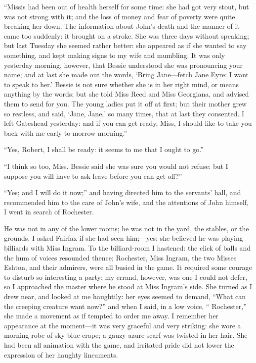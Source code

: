 \enquote{Missis had been out of health herself for some time: she had
	got very stout, but was not strong with it; and the loss of money and
	fear of poverty were quite breaking her down. The information about \Mr{}
	John's death and the manner of it came too suddenly: it brought on a
	stroke. She was three days without speaking; but last Tuesday she
	seemed rather better: she appeared as if she wanted to say something,
	and kept making signs to my wife and mumbling. It was only yesterday
	morning, however, that Bessie understood she was pronouncing your name;
	and at last she made out the words, \enquote{Bring Jane---fetch Jane
		Eyre: I want to speak to her.} Bessie is not sure whether she is in her
	right mind, or means anything by the words; but she told Miss Reed and
	Miss Georgiana, and advised them to send for you. The young ladies put
	it off at first; but their mother grew so restless, and said,
	\enquote{Jane, Jane,} so many times, that at last they consented. I
	left Gateshead yesterday: and if you can get ready, Miss, I should like
	to take you back with me early to-morrow morning.}

\enquote{Yes, Robert, I shall be ready: it seems to me that I ought to
	go.}

\enquote{I think so too, Miss. Bessie said she was sure you would not
	refuse: but I suppose you will have to ask leave before you can get
	off?}

\enquote{Yes; and I will do it now;} and having directed him to the
servants' hall, and recommended him to the care of John's wife, and the
attentions of John himself, I went in search of \Mr{} Rochester.

He was not in any of the lower rooms; he was not in the yard, the
stables, or the grounds. I asked \Mrs{} Fairfax if she had seen
him;---yes: she believed he was playing billiards with Miss Ingram. To
the billiard-room I hastened: the click of balls and the hum of voices
resounded thence; \Mr{} Rochester, Miss Ingram, the two Misses Eshton, and
their admirers, were all busied in the game. It required some courage
to disturb so interesting a party; my errand, however, was one I could
not defer, so I approached the master where he stood at Miss Ingram's
side. She turned as I drew near, and looked at me haughtily: her eyes
seemed to demand, \enquote{What can the creeping creature want now?} and
when I said, in a low voice, \enquote{\Mr{} Rochester,} she made a
movement as if tempted to order me away. I remember her appearance at
the moment---it was very graceful and very striking: she wore a morning
robe of sky-blue crape; a gauzy azure scarf was twisted in her hair.
She had been all animation with the game, and irritated pride did not
lower the expression of her haughty lineaments.

